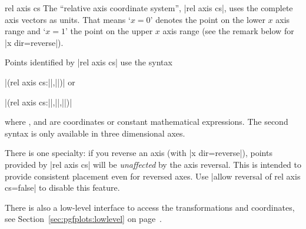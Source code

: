 \begin{coordinatesystem}{rel axis cs}
    The ``relative axis coordinate system'', |rel axis cs|, uses the complete
    axis vectors as units. That means `$x=0$' denotes the point on the lower
    $x$ axis range and `$x=1$' the point on the upper $x$ axis range (see the
    remark below for |x dir=reverse|).
\pgfplotsexpensiveexample
\begin{codeexample}[]
\end{codeexample}

\pgfplotsexpensiveexample
\begin{codeexample}[]
\end{codeexample}

    Points identified by |rel axis cs| use the syntax

        |(rel axis cs:||,||)| or

        |(rel axis cs:||,||,||)|

    \noindent where ,  and  are coordinates or constant
    mathematical expressions. The second syntax is only available in three
    dimensional axes.

    There is one specialty: if you reverse an axis (with |x dir=reverse|),
    points provided by |rel axis cs| will be \emph{unaffected} by the axis
    reversal. This is intended to provide consistent placement even for
    reversed axes. Use |allow reversal of rel axis cs=false| to disable this
    feature.

    There is also a low-level interface to access the transformations and
    coordinates, see Section~\ref{sec:pgfplots:lowlevel} on
    page~\pageref{sec:pgfplots:lowlevel}.
\end{coordinatesystem}


